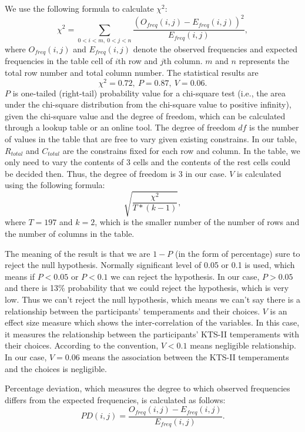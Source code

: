 We use the following formula to calculate $\chi^{2}$:
\begin{equation}
\chi^{2}=\sum_{0<i<m,\:0<j<n}
\frac{(O_{freq}(i,j)-E_{freq}(i,j))^{2}}{E_{freq}(i,j)},
\end{equation}
where $O_{freq}(i,j)$ and $E_{freq}(i,j)$ denote the observed frequencies and expected frequencies in the table cell of $i$th row and $j$th column. $m$ and $n$ represents the total row number and total column number. The statistical results are  
\begin{equation}
\chi^{2}=0.72,\:P=0.87,\:V=0.06.
\end{equation}
$P$ is one-tailed (right-tail) probability value for a chi-square test (i.e., the area under the chi-square distribution from the chi-square value to positive infinity), given the chi-square value and the degree of freedom, which can be calculated through a lookup table or an online tool. The degree of freedom $df$ is the number of values in the table that are free to vary given existing constrains. In our table, $R_{total}$ and $C_{total}$ are the constrains fixed for each row and column. In the table, we only need to vary the contents of 3 cells and the contents of the rest cells could be decided then. Thus, the degree of freedom is 3 in our case. $V$ is calculated using the following formula:
\begin{equation}
\sqrt{\frac{\chi^{2}}{T*(k-1)}},
\end{equation}
where $T=197$ and $k=2$, which is the smaller number of the number of rows and the number of columns in the table. 

The meaning of the result is that we are $1-P$ (in the form of percentage) sure to reject the null hypothesis. Normally significant level of 0.05 or 0.1 is used, which means if $P<0.05$ or $P<0.1$ we can reject the hypothesis. In our case, $P>0.05$ and there is 13\% probability that we could reject the hypothesis, which is very low. Thus we can't reject the null hypothesis, which means we can't say there is a relationship between the participants' temperaments and their choices. $V$ is an effect size measure which shows the inter-correlation of the variables. In this case, it measures the relationship between the participants' KTS-II temperaments with their choices. According to the convention, $V<0.1$ means negligible relationship. In our case, $V=0.06$ means the association between the KTS-II temperaments and the choices is negligible.   

Percentage deviation, which measures the degree to which observed frequencies differs from the expected frequencies, is calculated as follows:
\begin{equation}
PD(i,j)=\frac{O_{freq}(i,j)-E_{freq}(i,j)}{E_{freq}(i,j)}.
\end{equation}

